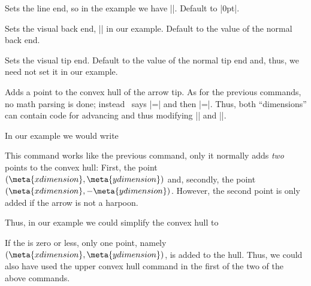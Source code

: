 \begin{command}{\pgfdeclarearrow{}}
\begin{itemize}
            \begin{command}{\pgfarrowssetlineend{}}
                Sets the line end, so in the example we have
                |\pgfarrowssettipend{-1cm}|. Default to |0pt|.
            \end{command}

            \begin{command}{\pgfarrowssetvisualbackend{}}
                Sets the visual back end, |\pgfarrowssetvisualbackend{-2cm}| in
                our example. Default to the value of the normal back end.
            \end{command}

            \begin{command}{\pgfarrowssetvisualtipend{}}
                Sets the visual tip end. Default to the value of the normal tip
                end and, thus, we need not set it in our example.
            \end{command}

            \begin{command}{\pgfarrowshullpoint{}}
                Adds a point to the convex hull of the arrow tip. As for the
                previous commands, no math parsing is done; instead \pgfname\
                says |\pgf@x=| and then |\pgf@y=|\meta{y
                dimension}. Thus, both ``dimensions'' can contain code for
                advancing and thus modifying |\pgf@x| and |\pgf@y|.

                In our example we would write
\begin{codeexample}
\pgfarrowshullpoint{1cm}{0pt}
\pgfarrowshullpoint{-3cm}{2cm}
\pgfarrowshullpoint{-3cm}{-2cm}
\end{codeexample}
            \end{command}

            \begin{command}{\pgfarrowsupperhullpoint{}}
                This command works like the previous command, only it normally
                adds \emph{two} points to the convex hull: First, the point
                $(\meta{x dimension},\meta{y dimension})$ and, secondly, the
                point $(\meta{x dimension},-\meta{y dimension})$. However, the
                second point is only added if the arrow is not a harpoon.

                Thus, in our example we could simplify the convex hull to
\begin{codeexample}
\pgfarrowshullpoint{1cm}{0pt}
\pgfarrowsupperhullpoint{-3cm}{2cm}
\end{codeexample}
                If the  is zero or less, only one point,
                namely $(\meta{x dimension},\meta{y dimension})$, is added to
                the hull. Thus, we could also have used the upper convex hull
                command in the first of the two of the above commands.
            \end{command}


\end{itemize}
\end{command}
